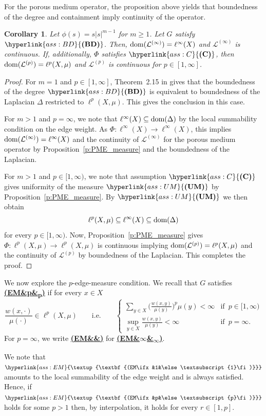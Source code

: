 \documentclass[letterpaper]{article}
\newtheorem{corollary}[lemma]{Corollary}
\theoremstyle{definition}
\theoremstyle{named}
\numberwithin{equation}{section}
\newcommand{\UM}{\hyperlink{ass:UM}{\textup{\textbf{(UM)}}}}
\newcommand{\BD}{\hyperlink{ass:BD}{\textup{\textbf{(BD)}}}}
\newcommand{\C}{\hyperlink{ass:C}{\textup{\textbf{(C)}}}}
\newcommand{\EM}[1][]{\hyperlink{ass:EM}{\textup{\textbf{(EM\ifx&#1&\else\textsubscript{#1}\fi)}}}}
\newcommand{\dom}{\textnormal{dom}} %
\newcommand{\Deltaphip}{\mathcal{L}^{(p)}}
\begin{document}
For the porous medium operator, the proposition above
yields that boundedness of the degree and containment imply continuity
of the operator.
\begin{corollary}\label{c:continuity}
Let $\phi(s)=s|s|^{m-1}$ for $m \geq 1$. Let $G$ satisfy $\BD$.
Then, $\dom({\mathcal{L}^{(\infty)}}) = \ell^\infty(X)$
and $\mathcal{L}^{(\infty)}$ is continuous.
If, additionally, $\Phi$ satisfies $\C$, then $\dom({\Deltaphip}) = \ell^p(X,\mu)$
and $\Deltaphip$ is continuous for $p \in [1,\infty]$.
\end{corollary}
\begin{proof}
For $m=1$ and $p \in [1,\infty]$,
Theorem~2.15 in \cite{keller2021graphs} gives that the boundedness of the degree $\BD$ is equivalent to 
boundedness of the Laplacian $\Delta$ restricted to $\ell^p(X,\mu)$. This gives the conclusion in this case.

For $m>1$ and $p=\infty$, we note that $\ell^\infty(X) \subseteq \dom(\Delta)$ by the local summability
condition on the edge weight. As $\Phi\colon \ell^\infty(X) \to \ell^\infty(X)$, this implies 
$\dom({\mathcal{L}^{(\infty)}}) = \ell^\infty(X)$
and the continuity of $\mathcal{L}^{(\infty)}$ for the porous medium operator
by Proposition~\ref{p:PME_measure} and the boundedness of the Laplacian.

For $m>1$ and $p \in [1,\infty)$, we note that assumption $\C$ gives uniformity of the measure
$\UM$ by Proposition~\ref{p:PME_measure}. By $\UM$ we then obtain 
$$\ell^p(X,\mu) \subseteq \ell^\infty(X) \subseteq \dom(\Delta)$$
for every $p \in [1,\infty)$. Now,
Proposition~\ref{p:PME_measure} gives $\Phi\colon \ell^p(X, \mu) \to \ell^p(X, \mu)$ is continuous
implying $\dom({\Deltaphip}) = \ell^p(X,\mu)$
and the continuity of $\Deltaphip$ by boundedness of the Laplacian. This completes the proof.
\end{proof}

We now explore the $p$-edge-measure condition. 
We recall that $G$ satisfies \EM[p] if for every $x\in X$
\[
  \frac{w(x,\cdot)}{\mu(\cdot)}\in \ell^{p}(X,\mu)
  \qquad\text{i.e.}\qquad
  \begin{cases}
  \sum_{y\in X}\biggl(\frac{w(x,y)}{\mu(y)}\biggr)^{p}\mu(y)<\infty &\text {if }\, p \in [1,\infty) \\
\sup_{y\in X}\frac{w(x,y)}{\mu(y)}<\infty &
  \text {if }\, p=\infty.
  \end{cases}
  \]
For $p=\infty$, we write \EM[] for \EM[$\infty$]. 

We note that $\EM[1]$ amounts to the local summability of the edge weight 
and is always satisfied. 
Hence, if $\EM[p]$ holds for some $p>1$ then,  
by interpolation, it holds for   every $r \in[1,p]$.
\end{document}
